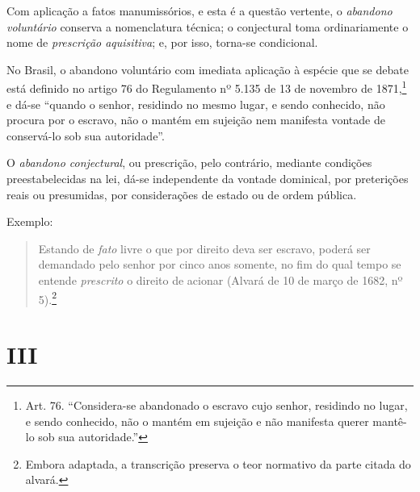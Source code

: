 {Com aplicação a fatos manumissórios, e esta é a questão vertente, o
\emph{abandono voluntário} conserva a nomenclatura técnica; o
conjectural toma ordinariamente o nome de \emph{prescrição aquisitiva};
e, por isso, torna-se condicional.

No Brasil, o abandono voluntário com imediata aplicação à espécie que se
debate está definido no artigo 76 do Regulamento nº 5.135 de 13 de
novembro de 1871,\footnote{Art. 76. ``Considera-se abandonado o escravo
  cujo senhor, residindo no lugar, e sendo conhecido, não o mantém em
  sujeição e não manifesta querer mantê-lo sob sua autoridade.''} e dá-se
``quando o senhor, residindo no mesmo lugar, e sendo conhecido, não
procura por o escravo, não o mantém em sujeição nem manifesta vontade de
conservá-lo sob sua autoridade''.

O \emph{abandono conjectural}, ou prescrição, pelo contrário, mediante
condições preestabelecidas na lei, dá-se independente da vontade
dominical, por preterições reais ou presumidas, por considerações de
estado ou de ordem pública.

Exemplo:

\begin{quote}
Estando de \emph{fato} livre o que por direito deva ser escravo, poderá
ser demandado pelo senhor por cinco anos somente, no fim do qual tempo
se entende \emph{prescrito} o direito de acionar (Alvará de 10 de março
de 1682, nº 5).\footnote{Embora adaptada, a transcrição preserva o
  teor normativo da parte citada do alvará.}
\end{quote}

\section*{III}

}
